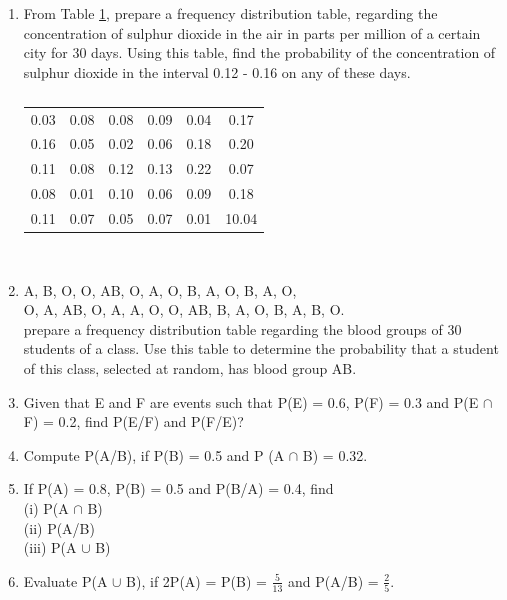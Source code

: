 \begin{enumerate}[label=\arabic*.,ref=\thesubsection.\theenumi]
\item From Table \ref{table:1.2.10}, 
prepare a frequency distribution table, regarding the concentration of sulphur dioxide in the air in parts per million of a certain city for 30 days.   Using this table, find the probability of the concentration of sulphur dioxide in the interval 0.12 - 0.16 on any of these days.
%
\begin{table}[!ht]
\centering
\begin{tabular}{ cccccc} 

  0.03 &0.08 &0.08 &0.09 &0.04 &0.17 \\
 0.16 &0.05 &0.02 &0.06 &0.18 &0.20 \\
 0.11 &0.08 &0.12 &0.13 &0.22 &0.07  \\
 0.08 &0.01 &0.10 &0.06 &0.09 &0.18 \\ 
  0.11 &0.07 &0.05 &0.07 &0.01 &10.04 \\ 
 \end{tabular}\\
\caption{}
\label{table:1.2.10}
\end{table}
\solution

\item  
A, B, O, O, AB, O, A, O, B, A, O, B, A, O,\\ O,
A, AB, O, A, A, O, O, AB, B, A, O, B, A, B, O.\\
prepare a frequency distribution table regarding the blood groups of 30 students of a class. Use this table to determine the probability that a student of this class, selected at random, has blood group AB.\\
\item Given that E and F are events such that P(E) = 0.6, P(F) = 0.3 and P(E $\cap$ F) = 0.2, find P(E/F) and P(F/E)?\\

\item Compute P(A/B), if P(B) = 0.5 and P (A $\cap$ B) = 0.32.\\

\item If P(A) = 0.8, P(B) = 0.5 and P(B/A) = 0.4, find\\
(i) P(A $\cap$ B)\\
(ii) P(A/B)\\ 
(iii) P(A $\cup$ B)\\

\item Evaluate P(A $\cup$ B), if 2P(A) = P(B)  = $\frac{5}{13}$ and P(A/B) =  $\frac{2}{5}.$\\


\end{enumerate}
